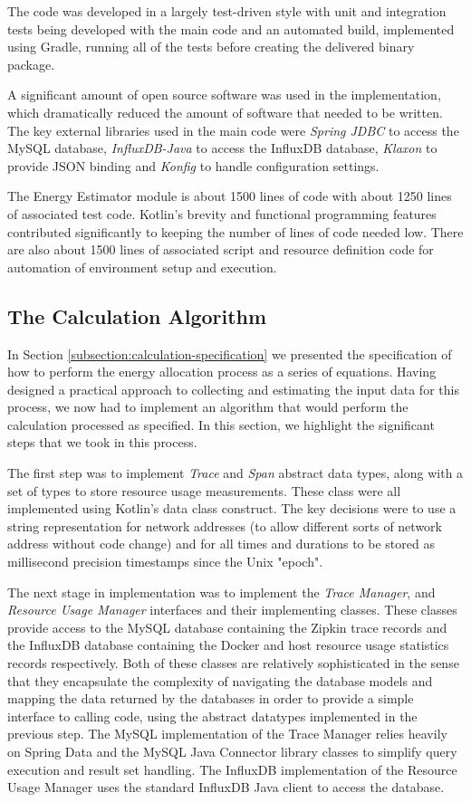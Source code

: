 The code was developed in a largely test-driven style with unit and integration tests being developed with the main code and an automated build, implemented using Gradle, running all of the tests before creating the delivered binary package.

A significant amount of open source software was used in the implementation, which dramatically reduced the amount of software that needed to be written.  The key external libraries used in the main code were \emph{Spring JDBC} to access the MySQL database, \emph{InfluxDB-Java} to access the InfluxDB database, \emph{Klaxon} to provide JSON binding and \emph{Konfig} to handle configuration settings. 

The Energy Estimator module is about 1500 lines of code with about 1250 lines of associated test code.  Kotlin's brevity and functional programming features contributed significantly to keeping the number of lines of code needed low.  There are also about 1500 lines of associated script and resource definition code for automation of environment setup and execution.

\subsection{The Calculation Algorithm}
\label{subsection:algorithm}

In Section \ref{subsection:calculation-specification} we presented the specification of how to perform the energy allocation process as a series of equations.  Having designed a practical approach to collecting and estimating the input data for this process, we now had to implement an algorithm that would perform the calculation processed as specified.  In this section, we highlight the significant steps that we took in this process.

The first step was to implement \emph{Trace} and \emph{Span} abstract data types, along with a set of types to store resource usage measurements.  These class were all implemented using Kotlin's data class construct.  The key decisions were to use a string representation for network addresses (to allow different sorts of network address without code change) and for all times and durations to be stored as millisecond precision timestamps since the Unix "epoch".

The next stage in implementation was to implement the \emph{Trace Manager}, and \emph{Resource Usage Manager} interfaces and their implementing classes.  These classes provide access to the MySQL database containing the Zipkin trace records and the InfluxDB database containing the Docker and host resource usage statistics records respectively.  Both of these classes are relatively sophisticated in the sense that they encapsulate the complexity of navigating the database models and mapping the data returned by the databases in order to provide a simple interface to calling code, using the abstract datatypes implemented in the previous step.  The MySQL implementation of the Trace Manager relies heavily on Spring Data and the MySQL Java Connector library classes to simplify query execution and result set handling.  The InfluxDB implementation of the Resource Usage Manager uses the standard InfluxDB Java client to access the database.

